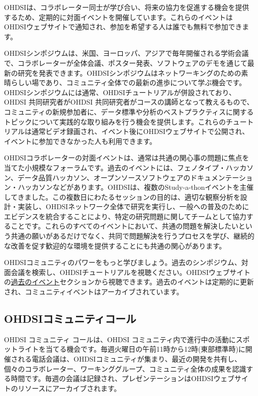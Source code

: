 \documentclass[
  11pt]{book}
\theoremstyle{definition}
\theoremstyle{definition}
\theoremstyle{definition}
\theoremstyle{definition}
\theoremstyle{remark}
\begin{document}
OHDSIは、コラボレーター同士が学び合い、将来の協力を促進する機会を提供するため、定期的に対面イベントを開催しています。これらのイベントはOHDSIウェブサイトで通知され、参加を希望する人は誰でも無料で参加できます。

OHDSIシンポジウムは、米国、ヨーロッパ、アジアで毎年開催される学術会議で、コラボレーターが全体会議、ポスター発表、ソフトウェアのデモを通じて最新の研究を発表できます。OHDSIシンポジウムはネットワーキングのための素晴らしい場であり、コミュニティ全体での最新の進歩について学ぶ機会です。OHDSIシンポジウムには通常、OHDSIチュートリアルが併設されており、OHDSI 共同研究者がOHDSI 共同研究者がコースの講師となって教えるもので、コミュニティの新規参加者に、データ標準や分析のベストプラクティスに関するトピックについて実践的な取り組みを行う機会を提供します。これらのチュートリアルは通常ビデオ録画され、イベント後にOHDSIウェブサイトで公開され、イベントに参加できなかった人も利用できます。

OHDSIコラボレーターの対面イベントは、通常は共通の関心事の問題に焦点を当てた小規模なフォーラムです。過去のイベントには、フェノタイプ・ハッカソン、データ品質ハッカソン、オープンソースソフトウェアのドキュメンテーション・ハッカソンなどがあります。OHDSIは、複数のStudy-a-thonイベントを主催してきました。この複数日にわたるセッションの目的は、適切な観察分析を設計・実装し、OHDSIネットワーク全体で研究を実行し、一般への普及のためにエビデンスを統合することにより、特定の研究問題に関してチームとして協力することです。これらのすべてのイベントにおいて、共通の問題を解決したいという共通の願いがあるだけでなく、共同で問題解決を行うプロセスを学び、継続的な改善を促す歓迎的な環境を提供することにも共通の関心があります。

OHDSIコミュニティのパワーをもっと学びましょう。過去のシンポジウム、対面会議を検索し、OHDSIチュートリアルを視聴ください。OHDSIウェブサイトの\href{https://www.ohdsi.org/past-events/}{過去のイベント}セクションから視聴できます。過去のイベントは定期的に更新され、コミュニティイベントはアーカイブされています。

\subsection{OHDSIコミュニティコール}\label{ohdsiux30b3ux30dfux30e5ux30cbux30c6ux30a3ux30b3ux30fcux30eb}

OHDSI コミュニティ コールは、OHDSI コミュニティ内で進行中の活動にスポットライトを当てる機会です。毎週火曜日の午前11時から12時(東部標準時)に開催される電話会議は、OHDSIコミュニティが集まり、最近の開発を共有し、個々のコラボレーター、ワーキンググループ、コミュニティ全体の成果を認識する時間です。毎週の会議は記録され、プレゼンテーションはOHDSIウェブサイトのリソースにアーカイブされます。
\end{document}
